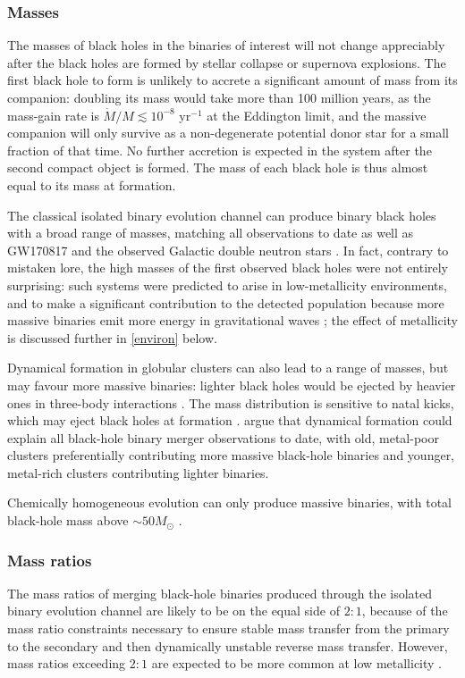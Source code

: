 \documentclass[review]{elsarticle}
\begin{document}
\subsubsection{Masses}
The masses of black holes in the binaries of interest will not change appreciably after the black holes are formed by stellar collapse or supernova explosions.  The first black hole to form is unlikely to accrete a significant amount of mass from its companion: doubling its mass would take more than 100 million years, as the mass-gain rate is $\dot{M}/M \lesssim 10^{-8}$ yr$^{-1}$ at the Eddington limit, and the massive companion will only survive as a non-degenerate potential donor star for a small fraction of that time. No further accretion is expected in the system after the second compact object is formed. The mass of each black hole is thus almost equal to its mass at formation. 

The classical isolated binary evolution channel can produce binary black holes with a broad range of masses, matching all observations to date \citep[e.g.,][]{Stevenson:2017,Eldridge:2017,GiacobboMapelli:2018} as well as GW170817 and the observed Galactic double neutron stars \citep[e.g.,][]{Kruckow:2018,VignaGomez:2018}.  In fact, contrary to mistaken lore, the high masses of the first observed black holes were not entirely surprising: such systems were predicted to arise in low-metallicity environments, and to make a significant contribution to the detected population because more massive binaries emit more energy in gravitational waves \citep{Dominik:2014}; the effect of metallicity is discussed further in \autoref{environ} below. 

Dynamical formation in globular clusters can also lead to a range of masses, but may favour more massive binaries: lighter black holes would be ejected by heavier ones in three-body interactions \citep{Rodriguez:2015}. The mass distribution is sensitive to natal kicks, which may eject black holes at formation \citep{Zevin:2017}.  \citet{Chatterjee:2017} argue that dynamical formation could explain all black-hole binary merger observations to date, with old, metal-poor clusters preferentially contributing more massive black-hole binaries and younger, metal-rich clusters contributing lighter binaries.
 
Chemically homogeneous evolution can only produce massive binaries, with total black-hole mass above $\sim 50 M_\odot$ \citep{MandeldeMink:2016,Marchant:2016}.

\subsubsection{Mass ratios}
The mass ratios of merging black-hole binaries produced through the isolated binary evolution channel are likely to be on the equal side of $2:1$, because of the mass ratio constraints necessary to ensure stable mass transfer from the primary to the secondary and then dynamically unstable reverse mass transfer. However, mass ratios exceeding $2:1$ are expected to be more common at low metallicity \citep{Dominik:2012,Stevenson:2017}.
\end{document}
